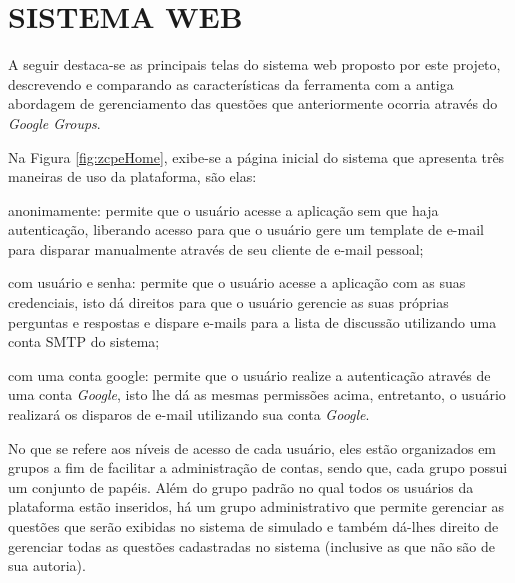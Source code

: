 \section{SISTEMA WEB}

A seguir destaca-se as principais telas do sistema web proposto por este
projeto, descrevendo e comparando as características da ferramenta com a antiga
abordagem de gerenciamento das questões que anteriormente ocorria através do
\textit{Google Groups}.

Na Figura \ref{fig:zcpeHome}, exibe-se a página inicial do sistema que apresenta
três maneiras de uso da plataforma, são elas:

\begin{alineas}
    \item anonimamente: permite que o usuário acesse a aplicação sem que haja
    autenticação, liberando acesso para que o usuário gere um template de e-mail
    para disparar manualmente através de seu cliente de e-mail pessoal;
    \item com usuário e senha: permite que o usuário acesse a aplicação com as
    suas credenciais, isto dá direitos para que o usuário gerencie as suas
    próprias perguntas e respostas e dispare e-mails para a lista de discussão
    utilizando uma conta \acs{SMTP} do sistema;
    \item com uma conta google: permite que o usuário realize a autenticação
    através de uma conta \textit{Google}, isto lhe dá as mesmas permissões
    acima, entretanto, o usuário realizará os disparos de e-mail utilizando sua conta
    \textit{Google}.
\end{alineas}

No que se refere aos níveis de acesso  de cada usuário, eles estão organizados
em grupos a fim de facilitar a administração de contas, sendo que, cada grupo
possui um conjunto de papéis. Além do grupo padrão no qual todos os usuários
da plataforma estão inseridos, há um grupo administrativo que permite gerenciar
as questões que serão exibidas no sistema de simulado e também dá-lhes direito
de gerenciar todas as questões cadastradas no sistema (inclusive as que não são
de sua autoria).

